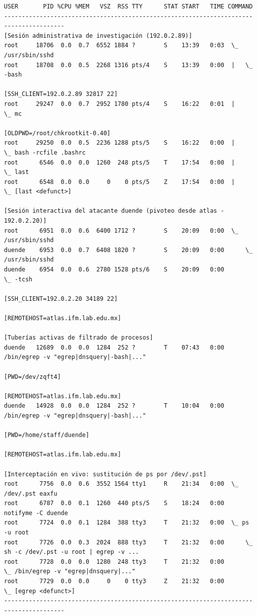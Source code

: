 \begin{lstlisting}[style=terminal]
USER       PID %CPU %MEM   VSZ  RSS TTY      STAT START   TIME COMMAND
---------------------------------------------------------------------------------------
[Sesión administrativa de investigación (192.0.2.89)]
root     18706  0.0  0.7  6552 1884 ?        S    13:39   0:03  \_ /usr/sbin/sshd
root     18708  0.0  0.5  2268 1316 pts/4    S    13:39   0:00  |   \_ -bash
                                                       [SSH_CLIENT=192.0.2.89 32817 22]
root     29247  0.0  0.7  2952 1780 pts/4    S    16:22   0:01  |       \_ mc
                                                       [OLDPWD=/root/chkrootkit-0.40]
root     29250  0.0  0.5  2236 1288 pts/5    S    16:22   0:00  |           \_ bash -rcfile .bashrc
root      6546  0.0  0.0  1260  248 pts/5    T    17:54   0:00  |               \_ last
root      6548  0.0  0.0     0    0 pts/5    Z    17:54   0:00  |                   \_ [last <defunct>]

[Sesión interactiva del atacante duende (pivoteo desde atlas - 192.0.2.20)]
root      6951  0.0  0.6  6400 1712 ?        S    20:09   0:00  \_ /usr/sbin/sshd
duende    6953  0.0  0.7  6408 1820 ?        S    20:09   0:00      \_ /usr/sbin/sshd
duende    6954  0.0  0.6  2780 1528 pts/6    S    20:09   0:00          \_ -tcsh
                                                       [SSH_CLIENT=192.0.2.20 34189 22]
                                                       [REMOTEHOST=atlas.ifm.lab.edu.mx]

[Tuberías activas de filtrado de procesos]
duende   12689  0.0  0.0  1284  252 ?        T    07:43   0:00 /bin/egrep -v "egrep|dnsquery|-bash|..."
                                                       [PWD=/dev/zqft4]
                                                       [REMOTEHOST=atlas.ifm.lab.edu.mx]
duende   14928  0.0  0.0  1284  252 ?        T    10:04   0:00 /bin/egrep -v "egrep|dnsquery|-bash|..."
                                                       [PWD=/home/staff/duende]
                                                       [REMOTEHOST=atlas.ifm.lab.edu.mx]

[Interceptación en vivo: sustitución de ps por /dev/.pst]
root      7756  0.0  0.6  3552 1564 tty1     R    21:34   0:00  \_ /dev/.pst eaxfu
root      6787  0.0  0.1  1260  440 pts/5    S    18:24   0:00 notifyme -C duende
root      7724  0.0  0.1  1284  388 tty3     T    21:32   0:00  \_ ps -u root
root      7726  0.0  0.3  2024  888 tty3     T    21:32   0:00      \_ sh -c /dev/.pst -u root | egrep -v ...
root      7728  0.0  0.0  1280  248 tty3     T    21:32   0:00          \_ /bin/egrep -v "egrep|dnsquery|..."
root      7729  0.0  0.0     0    0 tty3     Z    21:32   0:00              \_ [egrep <defunct>]
---------------------------------------------------------------------------------------
\end{lstlisting}

